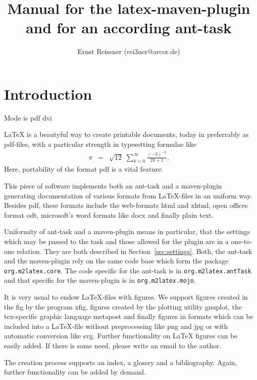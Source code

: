 \documentclass[12pt]{article}
\title{Manual for the latex-maven-plugin and for an according ant-task }
\author{Ernst Reissner (rei3ner@arcor.de)}
\begin{document}
\maketitle

\tableofcontents
\listoffigures
\listoftables


\section{Introduction}

Mode is 
\ifpdf
pdf
\else
dvi
\fi

\LaTeX{} is a beautyful way to create printable documents, 
today in preferrably as \gls{pdf}-files, 
with a particular strength in typesetting formulae like 
%
\begin{eqnarray*}
\pi & = & \sqrt{12}\;\sum^\infty_{k=0} \frac{(-3)^{-k}}{2k+1}. 
\end{eqnarray*}
%
Here, portability of the format \gls{pdf} is a vital feature. 

This piece of software implements both an ant-task and a maven-plugin 
generating documentation of various formats from \LaTeX-files 
in an uniform way. 
Besides \gls{pdf}, these formats include the web-formats \gls{html} 
and \gls{xhtml}, 
open offices format \gls{odt}, microsoft's word formats like \gls{docx} 
and finally plain text. 

Uniformity of ant-task and a maven-plugin means in particular, 
that the settings which may be passed to the task 
and those allowed for the plugin are in a one-to-one relation. 
They are both described in Section~\ref{sec:settings}. 
Both, the ant-task and the maven-plugin rely on the same code base 
which form the package {\tt org.m2latex.core}. 
The code specific for the ant-task is in {\tt org.m2latex.antTask} 
and that specific for the maven-plugin is in {\tt org.m2latex.mojo}. 

It is very usual to endow \LaTeX-files with figures. 
We support figures created in the \gls{fig} by the program xfig, 
figures created by the plotting utility gnuplot, 
the tex-specific graphic language metapost 
and finally figures in formats which can be included into a \LaTeX-file 
without preprocessing like \gls{png} and \gls{jpg} 
or with automatic conversion like \gls{svg}. 
Further functionality on \LaTeX{} figures can be easily added. 
If there is some need, please write an email to the author. 

The creation process supports an index, a glossry and a bibliography. 
Again, further functionality can be added by demand. 
\end{document}
